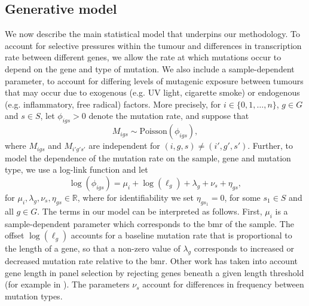 \documentclass[10pt,twoside,openright]{report}
\begin{document}
\subsection{Generative model \label{sec:genmodel}}
We now describe the main statistical model that underpins our methodology. To account for selective pressures within the tumour and differences in transcription rate between different genes, we allow the rate at which mutations occur to depend on the gene and type of mutation. We also include a sample-dependent parameter, to account for differing levels of mutagenic exposure between tumours that may occur due to exogenous (e.g. UV light, cigarette smoke) or endogenous (e.g. inflammatory, free radical) factors.  More precisely, for $i \in \{0, 1, \ldots, n\}$, $g \in G$ and $s \in S$, let $\phi_{igs} > 0$ denote the mutation rate, and suppose that
\begin{equation}
    \label{eq:Poisson}
M_{igs} \sim \mathrm{Poisson}(\phi_{igs}),
\end{equation}
where $M_{igs}$ and $M_{i'g's'}$ are independent for $(i,g,s) \neq (i',g',s')$.  Further, to model the dependence of the mutation rate on the sample, gene and mutation type, we use a log-link function and let 
\begin{equation}
    \label{eq:loglink}
\log(\phi_{igs}) =  \mu_i + \log(\ell_g) + \lambda_g + \nu_s + \eta_{gs},
\end{equation} 
for $\mu_i, \lambda_{g},\nu_{s},\eta_{gs} \in \mathbb{R}$, where for identifiability we set $\eta_{gs_1} = 0$, for  some $s_1 \in S$ and all $g \in G$. The terms in our model can be interpreted as follows. First, $\mu_i$ is a sample-dependent parameter which corresponds to the \acrshort{bmr} of the sample. The offset $\log(\ell_g)$ accounts for a baseline mutation rate that is proportional to the length of a gene, so that a non-zero value of $\lambda_g$ corresponds to increased or decreased mutation rate relative to the \acrshort{bmr}. Other work has taken into account gene length in panel selection by rejecting genes beneath a given length threshold (for example in \citet{lyu_mutation_2018}). The parameters $\nu_s$ account for differences in frequency between mutation types. 
\end{document}
